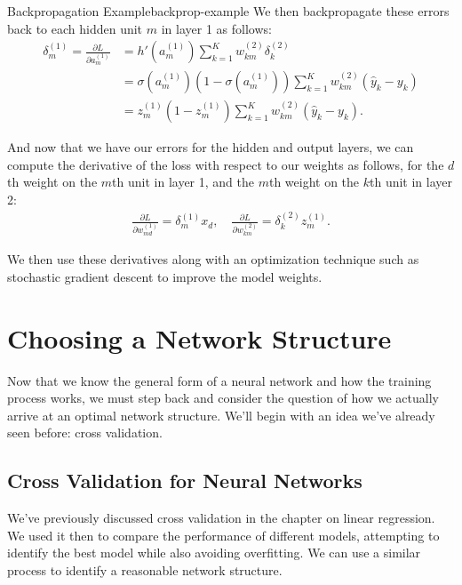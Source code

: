 \begin{example}{Backpropagation Example}{backprop-example}
	We then backpropagate these errors back to each hidden unit $m$ in layer 1 as follows:
	\begin{align*}
          \delta^{(1)}_{m} = \frac{\partial L}{\partial a_m^{(1)}} & =
                                                                     h'(a_m^{(1)})\sum_{k=1}^Kw^{(2)}_{km}\delta^{(2)}_k\\
                                                                   &=\sigma(a^{(1)}_m)(1-\sigma(a^{(1)}_m))\sum_{k=1}^Kw^{(2)}_{km}(\hat{y}_k-y_k)\\
                                                                   &=z_m^{(1)}(1-z_m^{(1)}) \sum_{k=1}^Kw^{(2)}_{km}(\hat{y}_k-y_k).
                                                                     \end{align*}

	And now that we have our errors for the hidden and output layers, we can compute the derivative of the loss with respect to our weights as follows, for the $d$th weight on the $m$th unit in layer 1, and the $m$th weight on the $k$th unit in layer 2: 
	\begin{align*}
		\frac{\partial L}{\partial w_{md}^{(1)}} = \delta^{(1)}_{m} x_{d}, \quad \frac{\partial L}{\partial w^{(2)}_{km}} = \delta^{(2)}_{k} z^{(1)}_{m}.
	\end{align*}
        
	We then use these derivatives along with an optimization technique such as stochastic gradient descent to improve the model weights.
\end{example}

\section{Choosing a Network Structure}
Now that we know the general form of a neural network and how the training process works, we must step back and consider the question of how we actually arrive at an optimal network structure. We'll begin with an idea we've already seen before: cross validation.

\subsection{Cross Validation for Neural Networks}
We've previously discussed cross validation in the chapter on linear regression. We used it then to compare the performance of different models, attempting to identify the best model while also avoiding overfitting. We can use a similar process to identify a reasonable network structure.

